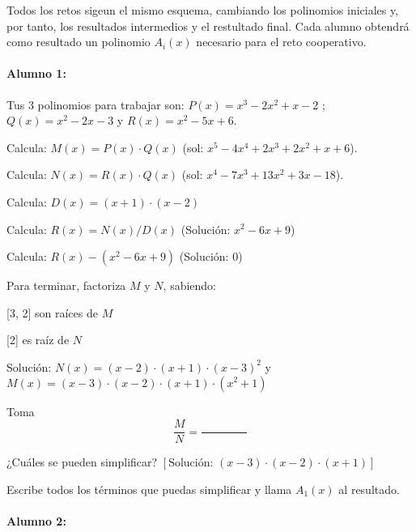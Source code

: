 

Todos los retos sigeun el mismo esquema, cambiando los polinomios iniciales y, por tanto, los resultados intermedios y el restultado final.
%
Cada alumno obtendrá como resultado un polinomio $A_i(x)$ necesario para el reto cooperativo.

\paragraph{Alumno 1:\\}



Tus 3 polinomios para trabajar son: $P(x) =  x^3 - 2x^2 + x - 2 $ ; $Q(x) =  x^2 - 2x - 3 $ y $R(x) =  x^2 - 5x + 6 $.



Calcula: $M(x) = P(x)\cdot  Q(x)$ (sol: $ x^5 - 4x^4 + 2x^3 + 2x^2 + x + 6 $).

Calcula: $N(x) = R(x)\cdot  Q(x)$ (sol: $ x^4 - 7x^3 + 13x^2 + 3x - 18 $).

Calcula: $D(x) = ( x + 1 )\cdot  ( x - 2 )$

Calcula: $R(x) = N(x) / D(x)$ (Solución: $ x^2 - 6x + 9 $)

Calcula: $R(x) - ( x^2 - 6x + 9 )$ (Solución: $ 0 $)

Para terminar, factoriza $M$ y $N$, sabiendo:

     [3, 2]  son raíces de $M$

     [2]  es raíz de $N$

Solución: $N(x) =  (x - 2) \cdot  (x + 1) \cdot  (x - 3)^2 $ y $M(x) =  (x - 3) \cdot  (x - 2) \cdot  (x + 1) \cdot  (x^2 + 1) $

Toma \[\frac{M}{N} = \frac{\quad\quad\quad\quad}{\quad\quad\quad\quad}\]

¿Cuáles se pueden simplificar? $\left[\text{Solución: } (x - 3) \cdot  (x - 2) \cdot  (x + 1) \right]$

Escribe todos los términos que puedas simplificar y llama $A_1(x)$ al resultado.













\paragraph{Alumno 2:\\}



